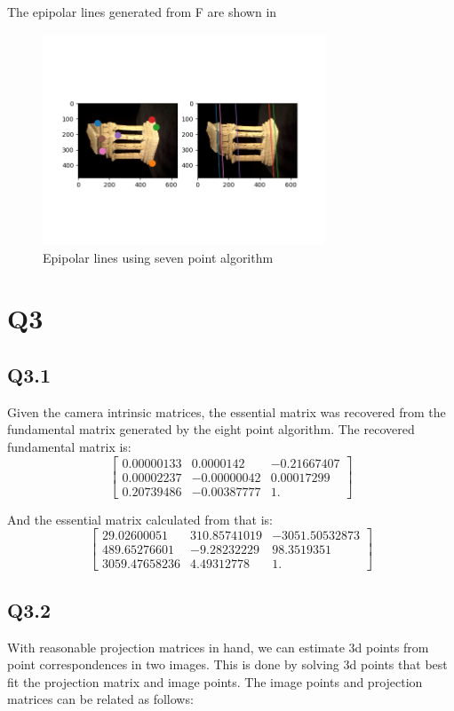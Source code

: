 \documentclass[12pt]{article}
\begin{document}
The epipolar lines generated from F are shown in 

\begin{figure}[H]
\centering
\includegraphics[page=1,width=0.75\textwidth]{q2_2}
\caption{ Epipolar lines using seven point algorithm } 
\label{fig:fepipolar7}
\end{figure}   

\newpage
\section{Q3}
\subsection{Q3.1}
Given the camera intrinsic matrices, the essential matrix was recovered from the fundamental matrix generated by the eight point algorithm.
The recovered fundamental matrix is:
$$
\begin{bmatrix}
0.00000133 & 0.0000142   & -0.21667407 \\
0.00002237 & -0.00000042 &  0.00017299 \\
0.20739486 & -0.00387777 &  1.        
\end{bmatrix}
$$

And the essential matrix calculated from that is:
$$
\begin{bmatrix}
29.02600051   &  310.85741019 & -3051.50532873 \\
489.65276601  &  -9.28232229  & 98.3519351 \\
3059.47658236 &    4.49312778 &    1.       
\end{bmatrix}
$$

\newpage
\subsection{Q3.2}
With reasonable projection matrices in hand, we can estimate 3d points from point correspondences in two images.  This is done by solving 3d points that best fit the projection matrix and image points.
The image points and projection matrices can be related as follows:  
  
\end{document}
